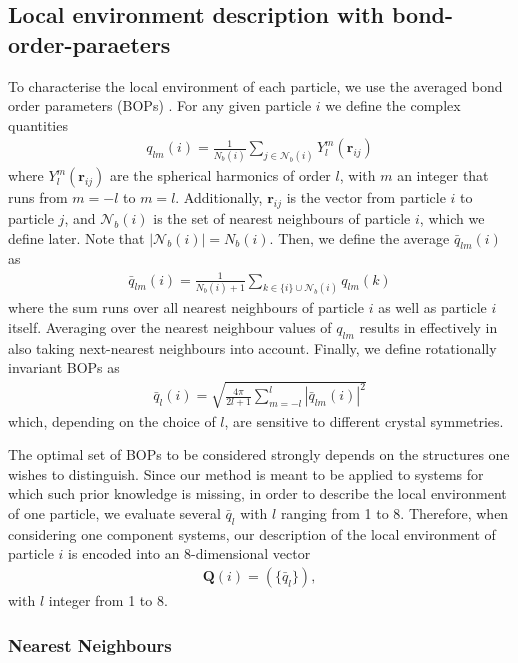 \documentclass{article}
\begin{document}
\subsection{Local environment description with bond-order-paraeters}\label{local_env}

	To characterise the local environment of each particle, we use the averaged bond order parameters (BOPs) \cite{bops}. For any given particle $i$ we define the complex quantities
	\begin{align}
		q_{lm}(i)=\frac1{N_b(i)}\sum_{j\in\mathcal{N}_b(i)}Y_l^m(\bm{r}_{ij})
	\end{align}
	where $Y_l^m(\bm{r}_{ij})$ are the spherical harmonics of order $l$, with $m$ an integer that runs from $m=-l$ to $m=l$. Additionally, $\bm{r}_{ij}$ is the vector from particle $i$ to particle $j$, and $\mathcal{N}_b(i)$ is the set of nearest neighbours of particle $i$, which we define later. Note that $|\mathcal{N}_b(i)|=N_b(i)$. Then, we define the average $\bar q_{lm}(i)$ as
	\begin{align}
		\bar q_{lm}(i)=\frac1{N_b(i)+1}\sum_{k\in\{i\}\cup\mathcal{N}_b(i)}q_{lm}(k)
	\end{align}
	where the sum runs over all nearest neighbours of particle $i$ as well as particle $i$ itself. Averaging over the nearest neighbour values of $q_{lm}$ results in effectively in also taking next-nearest neighbours into account. Finally, we define rotationally invariant BOPs as
	\begin{align}
		\bar q_l(i)=\sqrt{
		\frac{4\pi}{2l+1}
		\sum_{m=-l}^l|\bar q_{lm}(i)|^2
		}
	\end{align}
	which, depending on the choice of $l$, are sensitive to different crystal symmetries.
	
	The optimal set of BOPs to be considered strongly depends on the structures one wishes to distinguish. Since our method is meant to be applied to systems for which such prior knowledge is missing, in order to describe the local environment of one particle, we evaluate several $\bar q_l$ with $l$ ranging from 1 to 8.
	Therefore, when considering one component systems, our description of the local environment of particle $i$ is encoded into an $8$-dimensional vector
	\begin{align}
		\bm{Q}(i)=(\{\bar{q}_l\}),
		\label{state_vector}
	\end{align}
	with $l$ integer from 1 to 8.
	
\subsubsection{Nearest Neighbours}
\end{document}
